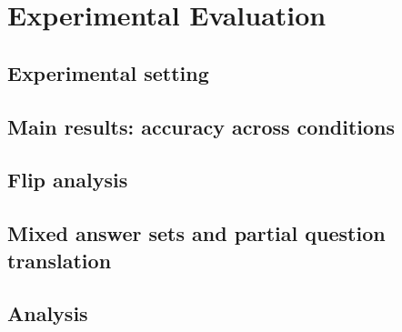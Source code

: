 \section{Experimental Evaluation}
\label{sec:experiments}


\subsection{Experimental setting}

\subsection{Main results: accuracy across conditions}

\subsection{Flip analysis}

\subsection{Mixed answer sets and partial question translation}

\subsection{Analysis}

